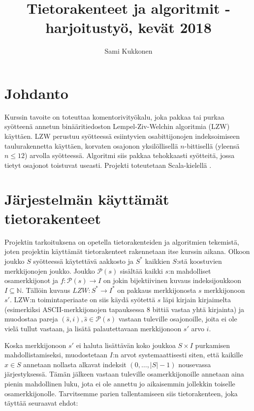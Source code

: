 \documentclass{article}
\title{Tietorakenteet ja algoritmit -harjoitustyö, kevät 2018}
\author{Sami Kukkonen}
\begin{document}
\maketitle

\section{Johdanto}

Kurssin tavoite on toteuttaa komentorivityökalu, joka pakkaa tai purkaa syötteenä annetun binääritiedoston Lempel-Ziv-Welchin algoritmia (LZW) käyttäen. LZW perustuu syötteessä esiintyvien osabittijonojen indeksoimiseen taulurakennetta käyttäen, korvaten osajonon yksilöllisellä $n$-bittisellä (yleensä $n\leq12$) arvolla syötteessä. Algoritmi siis pakkaa tehokkaasti syötteitä, jossa tietyt osajonot toistuvat useasti. \cite{Navarro1}\cite{Welch1} Projekti toteutetaan Scala-kielellä \cite{Odersky1}.

\section{Järjestelmän käyttämät tietorakenteet}

Projektin tarkoituksena on opetella tietorakenteiden ja algoritmien tekemistä, joten projektin käyttämät tietorakenteet rakennetaan itse kurssin aikana. Olkoon joukko $S$ syötteessä käytettävä aakkosto ja $S^*$ kaikkien $S$:stä koostuvien merkkijonojen joukko. Joukko  $\mathcal{P}(s)$ sisältää kaikki $s$:n mahdolliset osamerkkijonot ja $f: \mathcal{P}(s) \to I$ on jokin bijektiivinen kuvaus indeksijoukkoon $I \subseteq \mathbb{N}$. Tällöin kuvaus $LZW: S^* \to I^*$ on pakkaus merkkijonosta $s$ merkkijonoon $s'$. LZW:n toimintaperiaate on siis käydä syötettä $s$ läpi kirjain kirjaimelta (esimerkiksi ASCII-merkkijonojen tapauksessa 8 bittiä vastaa yhtä kirjainta) ja muodostaa pareja $(\hat{s}, i), \hat{s} \in \mathcal{P}(s)$ vastaan tuleville osajonoille, joita ei ole vielä tullut vastaan, ja lisätä palautettavaan merkkijonoon $s'$ arvo $i$. \cite{Welch1}

Koska merkkijonoon $s'$ ei haluta lisättävän koko joukkoa $S \times I$ purkamisen mahdollistamiseksi, muodostetaan $I$:n arvot systemaattisesti siten, että kaikille $x \in S$ annetaan nollasta alkavat indeksit $(0,\ldots,|S| - 1)$ nousevassa järjestyksessä. Tämän jälkeen vastaan tuleville osamerkkijonoille annetaan aina pienin mahdollinen luku, jota ei ole annettu jo aikaisemmin jollekkin toiselle osamerkkijonolle. \cite{Welch1} Tarvitsemme parien tallentamiseen siis tietorakenteen, joka täyttää seuraavat ehdot:
\end{document}

